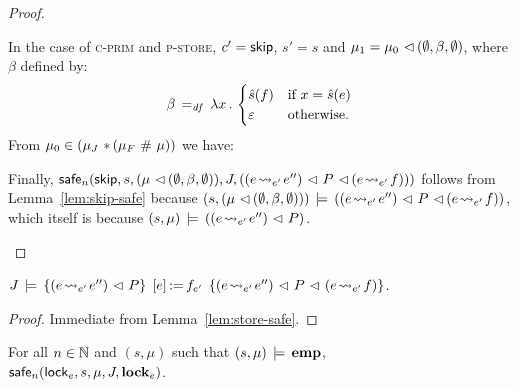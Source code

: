 \documentclass[11pt]{report}
\begin{document}
\begin{proof}
\begin{enumerate}
        In the case of \textsc{c-prim} and \textsc{p-store}, $c' = \cskip$, $s' = s$ and $\mu_1 = \mu_0 \fseq (\nil,\beta,\nil)$, where $\beta$ defined by: \[ \beta \eqdef \fun{x} \begin{cases}
          \ext{s}(f) & \text{if $x = \ext{s}(e)$} \\ 
          \lnil & \text{otherwise.}
        \end{cases}\] From $\mu_0 \in (\mu_J \fsep (\mu_F \fhash \mu))$ we have:        

         Finally, $\safe{n}{\cskip,s,(\mu \fseq (\nil,\beta,\nil)),J,((e \fwrite{e'} e'') \fseq P \fseq (e \fwrite{e'} f))}$ follows from Lemma~\ref{lem:skip-safe} because $(s,(\mu \fseq (\nil,\beta,\nil))) \sentails ((e \fwrite{e'} e'') \fseq P \fseq (e \fwrite{e'} f))$, which itself is because $(s,\mu) \sentails ((e \fwrite{e'} e'') \fseq P)$.  
    \end{enumerate}
\end{proof}

\begin{lemma}
    \label{lem:store-sound}
    $\truespec{J}{\left(e \fwrite{e'} e''\right) \fseq P}{\cstore{e}{f}_{e'}}{\left(e \fwrite{e'} e''\right) \fseq P \fseq \left(e \fwrite{e'} f\right)}$. 
\end{lemma} 

\begin{proof}
    Immediate from Lemma~\ref{lem:store-safe}. 
\end{proof}

\begin{lemma}
    \label{lem:lock-safe}
    For all $n \in \setnaturals$ and $(s,\mu)$ such that $(s,\mu) \sentails \femp$, \\ $\safe{n}{\clock_{e},s,\mu,J,\flock{e}}$. 
\end{lemma}
\end{document}
